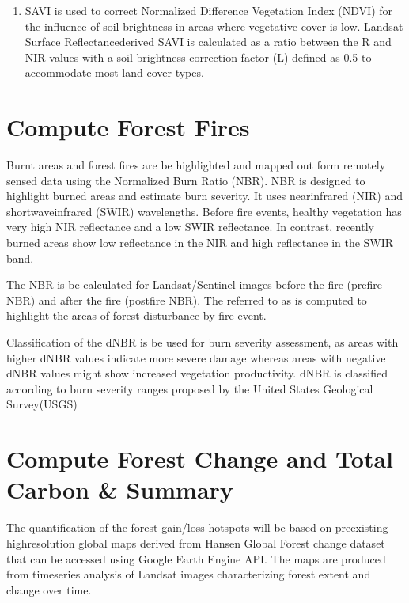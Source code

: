 \documentclass[letterpaper,10pt,english]{sphinxmanual}
\begin{document}
\begin{enumerate}
\item {} 
\sphinxAtStartPar
{}

\sphinxAtStartPar
SAVI is used to correct Normalized Difference Vegetation Index (NDVI) for the influence of
soil brightness in areas where vegetative cover is low. Landsat Surface Reflectance\sphinxhyphen{}derived
SAVI is calculated as a ratio between the R and NIR values with a soil brightness correction
factor (L) defined as 0.5 to accommodate most land cover types.


\end{enumerate}


\section{Compute Forest Fires}
\label{\detokenize{Qgis_Plugin/vegetation_degradation_training:compute-forest-fires}}
\sphinxAtStartPar
Burnt areas and forest fires are be highlighted and mapped out form remotely sensed 
data using the Normalized Burn Ratio (NBR). NBR is designed to highlight burned areas and estimate burn
severity. It uses near\sphinxhyphen{}infrared (NIR) and shortwave\sphinxhyphen{}infrared (SWIR) wavelengths. Before fire events,
healthy vegetation has very high NIR reflectance and a low SWIR reflectance. In contrast, recently
burned areas show low reflectance in the NIR and high reflectance in the SWIR band.

\sphinxAtStartPar
The NBR is be calculated for Landsat/Sentinel images before the fire (pre\sphinxhyphen{}fire NBR) and after
the fire (post\sphinxhyphen{}fire NBR). The  referred
to as  is computed to highlight the areas of forest disturbance by fire event.

\sphinxAtStartPar
Classification of the dNBR is be used for burn severity assessment, as areas with higher dNBR
values indicate more severe damage whereas areas with negative dNBR values might show increased
vegetation productivity. dNBR is classified according to burn severity ranges proposed by
the United States Geological Survey(USGS)


\section{Compute Forest Change and Total Carbon \& Summary}
\label{\detokenize{Qgis_Plugin/vegetation_degradation_training:compute-forest-change-and-total-carbon-summary}}
\sphinxAtStartPar
The quantification of the forest gain/loss hotspots will be based on pre\sphinxhyphen{}existing high\sphinxhyphen{}resolution
global maps derived from Hansen Global Forest change dataset that can be accessed using Google
Earth Engine API. The maps are produced from time\sphinxhyphen{}series analysis of Landsat images characterizing
forest extent and change over time.
\end{document}
